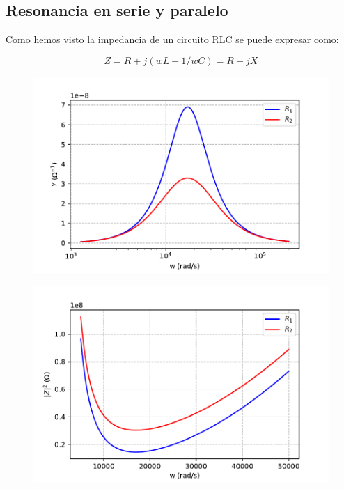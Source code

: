 \documentclass[12pt,a4paper]{article}
\begin{document}
\subsection{Resonancia en serie y paralelo}

Como hemos visto la impedancia de un circuito RLC se puede expresar como:

\begin{equation}
Z = R + j (wL-1/wC) = R + j X
\end{equation}

\begin{figure}[h!] \centering
\includegraphics[scale=0.8]{amictancia.pdf}
\end{figure}

\begin{figure}[h!] \centering
\includegraphics[scale=0.8]{impedancia.pdf}
\end{figure}
\end{document}

